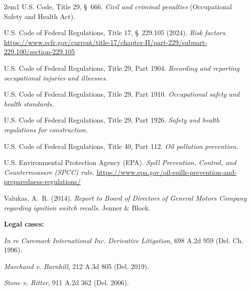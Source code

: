 \begin{hangparas}{2em}{1}
U.S. Code, Title 29, \S~666. \emph{Civil and criminal penalties} (Occupational
Safety and Health Act).

U.S. Code of Federal Regulations, Title 17, \S~229.105 (2024). \emph{Risk
factors}.
\url{https://www.ecfr.gov/current/title-17/chapter-II/part-229/subpart-229.100/section-229.105}

U.S. Code of Federal Regulations, Title 29, Part 1904. \emph{Recording and
reporting occupational injuries and illnesses.}

U.S. Code of Federal Regulations, Title 29, Part 1910. \emph{Occupational
safety and health standards.}

U.S. Code of Federal Regulations, Title 29, Part 1926. \emph{Safety and health
regulations for construction.}

U.S. Code of Federal Regulations, Title 40, Part 112. \emph{Oil pollution
prevention.}

U.S. Environmental Protection Agency (EPA). \emph{Spill Prevention, Control,
and Countermeasure (SPCC) rule.}
\url{https://www.epa.gov/oil-spills-prevention-and-preparedness-regulations/}

Valukas, A.~R. (2014). \emph{Report to Board of Directors of General Motors
Company regarding ignition switch recalls}. Jenner \& Block.

\textbf{Legal cases:}

\emph{In re Caremark International Inc. Derivative Litigation}, 698 A.2d 959
(Del. Ch. 1996).

\emph{Marchand v. Barnhill}, 212 A.3d 805 (Del. 2019).

\emph{Stone v. Ritter}, 911 A.2d 362 (Del. 2006).

\end{hangparas}
